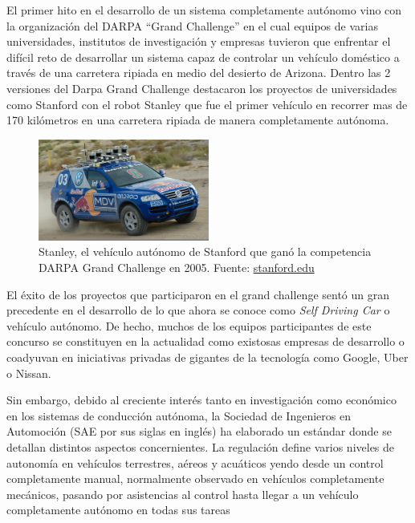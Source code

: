\documentclass[12pt,letterpaper]{article}
\begin{document}
El primer hito en el desarrollo de un sistema completamente autónomo vino 
con la organización del DARPA “Grand Challenge” en el cual equipos de varias universidades, 
institutos de investigación y empresas tuvieron que enfrentar el difícil reto de desarrollar 
un sistema capaz de controlar un vehículo doméstico a través de una carretera 
ripiada en medio del desierto de Arizona. Dentro las 2 versiones del Darpa Grand Challenge 
destacaron los proyectos de universidades como Stanford con el robot Stanley \cite{Thrun2006} que fue el primer 
vehículo en recorrer mas de 170 kilómetros en una carretera ripiada de manera completamente autónoma. 


\begin{figure}[!h] 
\centering
\includegraphics[width=0.5\textwidth]{stanley1}
\caption{Stanley, el vehículo autónomo de Stanford que ganó la competencia DARPA Grand Challenge en 2005. 
        Fuente: \href{http://stanford.edu/~cpiech/cs221/apps/driverlessCar.html}{stanford.edu} }
\label{fig:stanley1}
\end{figure}

El éxito de los proyectos que participaron en el grand challenge sentó un gran precedente en el desarrollo de lo que 
ahora se conoce como \textit{Self Driving Car} o vehículo autónomo. De hecho, muchos de los equipos 
participantes de este concurso se constituyen en la actualidad como existosas empresas de desarrollo o 
coadyuvan en iniciativas privadas de gigantes de la tecnología como Google, Uber o Nissan.


Sin embargo, debido al creciente interés tanto en investigación como económico en los sistemas de conducción 
autónoma, la Sociedad de Ingenieros en Automoción (SAE por sus siglas en inglés) ha elaborado un estándar donde se 
detallan distintos aspectos concernientes. La regulación define varios niveles de autonomía en 
vehículos terrestres, aéreos y acuáticos yendo desde un control completamente manual, 
normalmente observado en vehículos completamente mecánicos, pasando por asistencias al control 
hasta llegar a un vehículo completamente autónomo en todas sus tareas
\end{document}
